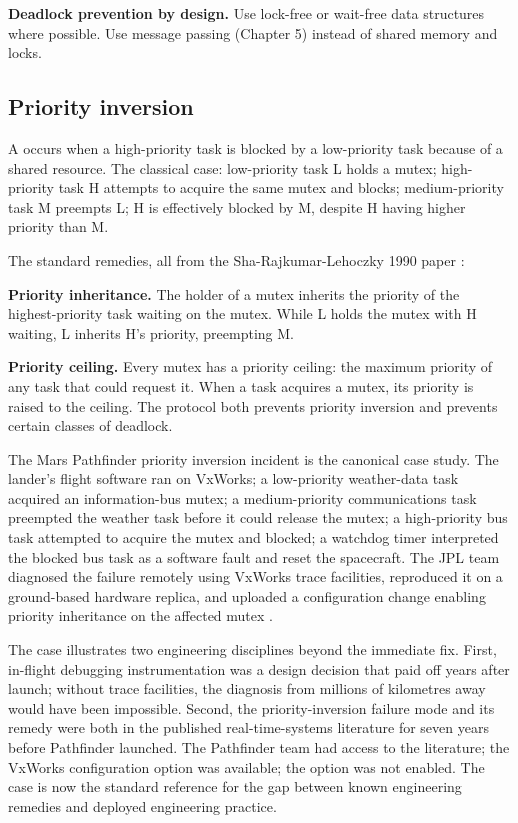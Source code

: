 \textbf{Deadlock prevention by design.} Use lock-free or wait-free data structures where possible. Use message passing (Chapter 5) instead of shared memory and locks.

\subsection{Priority inversion}

A  occurs when a high-priority task is blocked by a low-priority task because of a shared resource. The classical case: low-priority task L holds a mutex; high-priority task H attempts to acquire the same mutex and blocks; medium-priority task M preempts L; H is effectively blocked by M, despite H having higher priority than M.

The standard remedies, all from the Sha-Rajkumar-Lehoczky 1990 paper \cite{paper:sha-rajkumar-lehoczky-1990}:

\textbf{Priority inheritance.} The holder of a mutex inherits the priority of the highest-priority task waiting on the mutex. While L holds the mutex with H waiting, L inherits H's priority, preempting M.

\textbf{Priority ceiling.} Every mutex has a priority ceiling: the maximum priority of any task that could request it. When a task acquires a mutex, its priority is raised to the ceiling. The protocol both prevents priority inversion and prevents certain classes of deadlock.

The Mars Pathfinder priority inversion incident \cite{paper:jones-pathfinder-1997} is the canonical case study. The lander's flight software ran on VxWorks; a low-priority weather-data task acquired an information-bus mutex; a medium-priority communications task preempted the weather task before it could release the mutex; a high-priority bus task attempted to acquire the mutex and blocked; a watchdog timer interpreted the blocked bus task as a software fault and reset the spacecraft. The JPL team diagnosed the failure remotely using VxWorks trace facilities, reproduced it on a ground-based hardware replica, and uploaded a configuration change enabling priority inheritance on the affected mutex \cite{web:reeves-pathfinder-1998}.

The case illustrates two engineering disciplines beyond the immediate fix. First, in-flight debugging instrumentation was a design decision that paid off years after launch; without trace facilities, the diagnosis from millions of kilometres away would have been impossible. Second, the priority-inversion failure mode and its remedy were both in the published real-time-systems literature for seven years before Pathfinder launched. The Pathfinder team had access to the literature; the VxWorks configuration option was available; the option was not enabled. The case is now the standard reference for the gap between known engineering remedies and deployed engineering practice.

